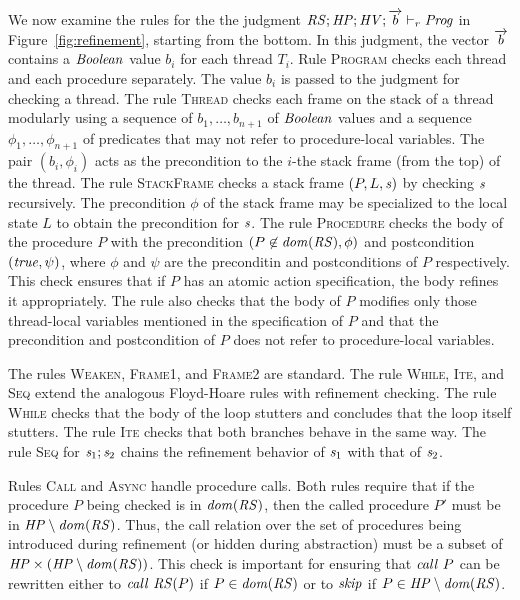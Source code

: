 We now examine the rules for the the judgment $\mathit{RS};\mathit{HP};\mathit{HV};\overrightarrow{b} \vdash_r \mathit{Prog}$ in Figure~\ref{fig:refinement},
starting from the bottom.
In this judgment, the vector $\overrightarrow{b}$ contains a $\mathit{Boolean}$ value $b_i$ for each thread $T_i$.
Rule \textsc{Program} checks each thread and each procedure separately.
The value $b_i$ is passed to the judgment for checking a thread.
The rule \textsc{Thread} checks each frame on the stack of a thread modularly using a sequence of $b_1,\ldots,b_{n+1}$ of 
$\mathit{Boolean}$ values and a sequence $\phi_1,\ldots,\phi_{n+1}$ of predicates that may not refer to procedure-local variables.
The pair $(b_i,\phi_i)$ acts as the precondition to the $i$-the stack frame (from the top) of the thread.
The rule \textsc{StackFrame} checks a stack frame $(P, L, \mathit{s})$ by checking $\mathit{s}$ recursively.
The precondition $\phi$ of the stack frame may be specialized to the local state $L$ to obtain the precondition for $\mathit{s}$.
The rule \textsc{Procedure} checks the body of the procedure $P$ with
the precondition $(P \not\in \mathit{dom}(\mathit{RS}),\phi)$ and postcondition $(\mathit{true},\psi)$,
where $\phi$ and $\psi$ are the preconditin and postconditions of $P$ respectively.
This check ensures that if $P$ has an atomic action specification, the body refines it appropriately.
The rule also checks that the body of $P$ modifies only those thread-local variables mentioned in the 
specification of $P$ and that the precondition and postcondition of $P$ does not refer to procedure-local variables.

The rules \textsc{Weaken}, \textsc{Frame1}, and \textsc{Frame2} are standard.
The rule \textsc{While}, \textsc{Ite}, and \textsc{Seq} extend the analogous Floyd-Hoare rules with refinement checking.
The rule \textsc{While} checks that the body of the loop stutters and concludes that the loop itself stutters.
The rule \textsc{Ite} checks that both branches behave in the same way.
The rule \textsc{Seq} for $\mathit{s}_1;\mathit{s}_2$ chains the refinement behavior of $\mathit{s}_1$ with that of $\mathit{s}_2$.

Rules \textsc{Call} and \textsc{Async} handle procedure calls.
Both rules require that if the procedure $P$ being checked is in $\mathit{dom}(\mathit{RS})$,
then the called procedure $P'$ must be in $\mathit{HP} \setminus \mathit{dom}(\mathit{RS})$.
Thus, the call relation over the set of procedures being introduced during refinement (or hidden during abstraction) 
must be a subset of $\mathit{HP} \times (\mathit{HP}\setminus\mathit{dom}(\mathit{RS}))$.
This check is important for ensuring that $\mathit{call}\ P$ can be rewritten either to $\mathit{call}\ \mathit{RS}(P)$ if $P \in \mathit{dom}(\mathit{RS})$ 
or to $\mathit{skip}$ if $P \in \mathit{HP} \setminus \mathit{dom}(\mathit{RS})$.

